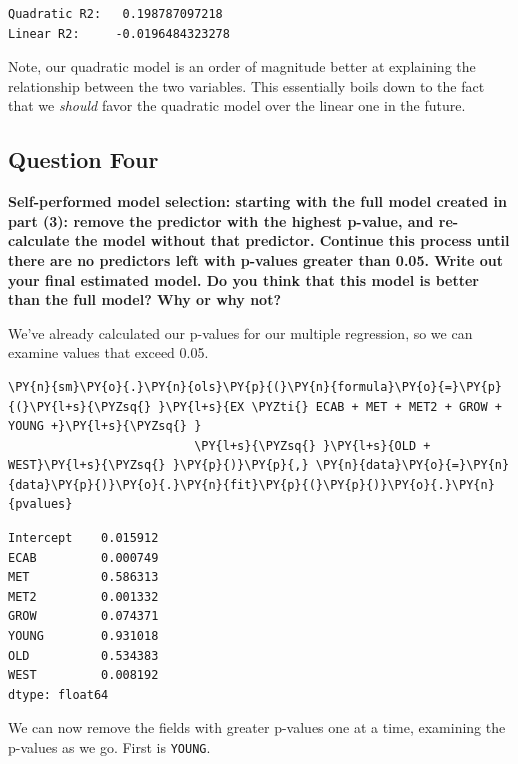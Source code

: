 \documentclass[10pt]{article}\usepackage[]{graphicx}\usepackage[]{xcolor}
\begin{document}
    \begin{Verbatim}[commandchars=\\\{\}]
Quadratic R2:   0.198787097218
Linear R2:     -0.0196484323278
    \end{Verbatim}

    Note, our quadratic model is an order of magnitude better at explaining the relationship between the two variables.
    This essentially boils down to the fact that we \emph{should} favor the quadratic model over the linear one in the
    future.

    \subsection*{Question Four}
    \textbf{Self-performed model selection: starting with the full model created in part (3): remove the predictor with
    the highest p-value, and re-calculate the model without that predictor. Continue this process until there are no
    predictors left with p-values greater than 0.05. Write out your final estimated model. Do you think that this model
    is better than the full model? Why or why not?}\newline

    We've already calculated our p-values for our multiple regression, so we can examine values that exceed 0.05.

    \begin{Verbatim}[commandchars=\\\{\}]
 \PY{n}{sm}\PY{o}{.}\PY{n}{ols}\PY{p}{(}\PY{n}{formula}\PY{o}{=}\PY{p}{(}\PY{l+s}{\PYZsq{} }\PY{l+s}{EX \PYZti{} ECAB + MET + MET2 + GROW + YOUNG +}\PY{l+s}{\PYZsq{} }
                          \PY{l+s}{\PYZsq{} }\PY{l+s}{OLD + WEST}\PY{l+s}{\PYZsq{} }\PY{p}{)}\PY{p}{,} \PY{n}{data}\PY{o}{=}\PY{n}{data}\PY{p}{)}\PY{o}{.}\PY{n}{fit}\PY{p}{(}\PY{p}{)}\PY{o}{.}\PY{n}{pvalues}
\end{Verbatim}

            \begin{Verbatim}[commandchars=\\\{\}]
Intercept    0.015912
ECAB         0.000749
MET          0.586313
MET2         0.001332
GROW         0.074371
YOUNG        0.931018
OLD          0.534383
WEST         0.008192
dtype: float64
\end{Verbatim}
        
    We can now remove the fields with greater p-values one at a time, examining the p-values as we go. First is
    \texttt{YOUNG}.
\end{document}
